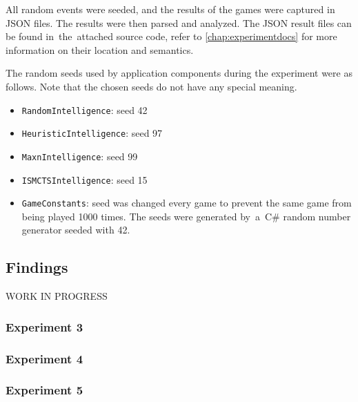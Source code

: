All random events were seeded, and the results of the games were captured in JSON
files.
The results were then parsed and analyzed. The JSON result files can be found
in~the~attached source code, refer to \autoref{chap:experimentdocs} for more information
on their location and semantics.

The random seeds used by application components during the experiment were as follows.
Note that the chosen seeds do not have any special meaning.
\begin{itemize}
    \item \texttt{RandomIntelligence}: seed 42
    \item \texttt{HeuristicIntelligence}: seed 97
    \item \texttt{MaxnIntelligence}: seed 99
    \item \texttt{ISMCTSIntelligence}: seed 15
    \item \texttt{GameConstants}: seed was changed every game to prevent the same game from
        being played 1000 times. The seeds were generated by~a~C\# 
        random number generator seeded with 42.
\end{itemize}

\subsection{Findings}

WORK IN PROGRESS

\subsubsection{Experiment 3}

\subsubsection{Experiment 4}

\subsubsection{Experiment 5}

